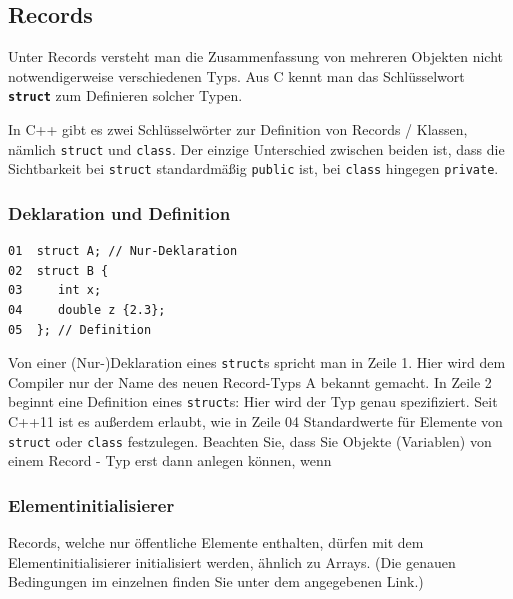 \documentclass[a4paper]{report}
\begin{document}
\subsection{Records}
Unter Records versteht man die Zusammenfassung von mehreren Objekten nicht notwendigerweise verschiedenen Typs. Aus C kennt man das Schlüsselwort \texttt{\textbf{struct}} zum Definieren solcher Typen.

In C++ gibt es zwei Schlüsselwörter zur Definition von Records / Klassen, nämlich \texttt{struct} und \texttt{class}. Der einzige Unterschied zwischen beiden ist, dass die Sichtbarkeit bei \texttt{struct} standardmäßig \texttt{public} ist, bei \texttt{class} hingegen \texttt{private}.

\subsubsection{Deklaration und Definition}

\begin{lstlisting}
01	struct A; // Nur-Deklaration
02	struct B { 
03	   int x;
04	   double z {2.3};
05	}; // Definition
\end{lstlisting}

Von einer (Nur-)Deklaration eines \texttt{struct}s spricht man in Zeile 1. Hier wird dem Compiler nur der Name des neuen Record-Typs A bekannt gemacht.
In Zeile 2 beginnt eine Definition eines \texttt{struct}s: Hier wird der Typ genau spezifiziert.
Seit C++11 ist es außerdem erlaubt, wie in Zeile 04 Standardwerte für Elemente von \texttt{struct} oder \texttt{class} festzulegen.
Beachten Sie, dass Sie Objekte (Variablen) von einem Record - Typ erst dann anlegen können, wenn 



\subsubsection{Elementinitialisierer}

Records, welche nur öffentliche Elemente enthalten, dürfen mit dem Elementinitialisierer initialisiert werden, ähnlich zu Arrays. (Die genauen Bedingungen im einzelnen finden Sie unter dem angegebenen Link.)
\end{document}
